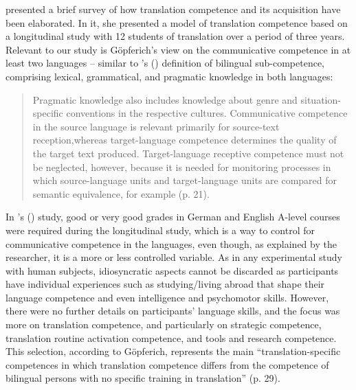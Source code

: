 \documentclass[output=paper]{langscibook}
\begin{document}
\citet{gopferich2009towards} presented a brief survey of how translation competence and its acquisition have been elaborated. In it, she presented a model of translation competence based on a longitudinal study with 12 students of translation over a period of three years. Relevant to our study is Göpferich’s view on the communicative competence in at least two languages -- similar to \citeauthor{beeby2005investigating}’s (\citeyear{beeby2005investigating}) definition of bilingual sub-competence, comprising lexical, grammatical, and pragmatic knowledge in both languages:

\begin{quote}
Pragmatic knowledge also includes knowledge about genre and situation-spe\-cif\-ic conventions in the respective cultures. Communicative competence in the source language is relevant primarily for source-text reception,\linebreak whereas target-language competence determines the quality of the target text produced. Target-language receptive competence must not be neglect\-ed, however, because it is needed for monitoring processes in which source-lan\-guage units and target-lan\-guage units are compared for semantic equivalence, for example (p. 21).
\end{quote}

In \citeauthor{gopferich2009towards}’s (\citeyear{gopferich2009towards}) study, good or very good grades in German and English A-level courses were required during the longitudinal study, which is a way to control for communicative competence in the languages, even though, as explained by the researcher, it is a more or less controlled variable. As in any experimental study with human subjects, idiosyncratic aspects cannot be discarded as participants have individual experiences such as studying/living abroad that shape their language competence and even intelligence and psychomotor skills. However, there were no further details on participants’ language skills, and the focus was more on translation competence, and particularly on strategic competence, translation routine activation competence, and tools and research competence. This selection, according to Göpferich, represents the main “translation-specific competences in which translation competence differs from the competence of bilingual persons with no specific training in translation” (p. 29).
\end{document}
